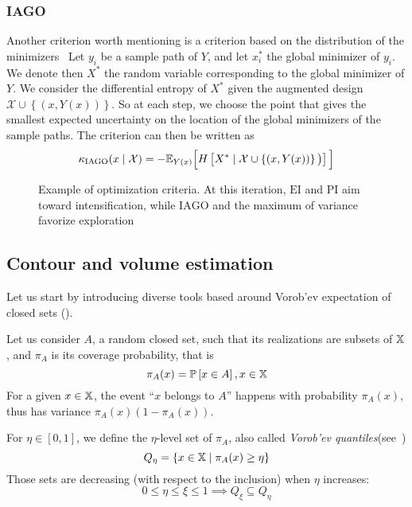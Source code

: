 \documentclass[../../Main_ManuscritThese.tex]{subfiles}
\newcommand\imgpath{/home/victor/acadwriting/Manuscrit/Text/Chapter4/img/}
\begin{document}
\subsubsection{IAGO}
\label{ssec:IAGO} Another criterion worth mentioning is a criterion based on the distribution of the minimizers~\cite{villemonteix_informational_2006,hennig_entropy_2011}
Let $y_i$ be a sample path of $Y$, and let $x_i^*$ the global minimizer of $y_i$.
We denote then $X^*$ the random variable corresponding to the global minimizer of $Y$.
We consider the differential entropy of $X^*$ given the augmented design $\mathcal{X} \cup \left\{\left(x,Y(x)\right)\right\}$.
 So at each step, we choose the point that gives the smallest expected uncertainty on the location of the global minimizers of the sample paths.
The criterion can then be written as
\begin{equation}
  \kappa_{\mathrm{IAGO}}(x \mid \mathcal{X})=-\mathbb{E}_{Y(x)}\Big[H\left[X^* \mid \mathcal{X} \cup \left\{(x, Y(x))\right\} \big)\right]\Big]
\end{equation}


\begin{figure}[ht!]
  \centering
  
  \caption{\label{fig:example_optimization_criteria} Example of optimization criteria. At this iteration, $\mathrm{EI}$ and $\mathrm{PI}$ aim toward intensification, while $\mathrm{IAGO}$ and the maximum of variance favorize exploration}
\end{figure}


 
\subsection{Contour and volume estimation}
Let us start by introducing diverse tools based around Vorob'ev expectation of closed sets (\cite{el_amri_analyse_2019,heinrich_level_2012,vorobyev_new_2003}). 

Let us consider $A$, a random closed set, such that its realizations are subsets of $\mathbb{X}$, and $\pi_A$ is its coverage probability, that is
\begin{equation}
  \pi_A(x) = \mathbb{P}\left[x\in A\right], x\in\mathbb{X}
\end{equation}
For a given $x\in\mathbb{X}$, the event ``$x$ belongs to $A$'' happens with probability $\pi_A(x)$, thus has variance $\pi_A(x)(1 - \pi_A(x))$.

For $\eta \in [0, 1]$, we define the $\eta$-level set of $\pi_A$, also called \emph{Vorob'ev quantiles}(see~\cite{vorobyev_new_2003})
\begin{equation}
  Q_{\eta} = \{x\in\mathbb{X} \mid \pi_A(x) \geq \eta \}
\end{equation}
Those sets are decreasing (with respect to the inclusion) when $\eta$ increases:
\begin{equation}
  0\leq \eta \leq \xi \leq 1 \implies Q_{\xi} \subseteq Q_{\eta}
\end{equation}
\end{document}
